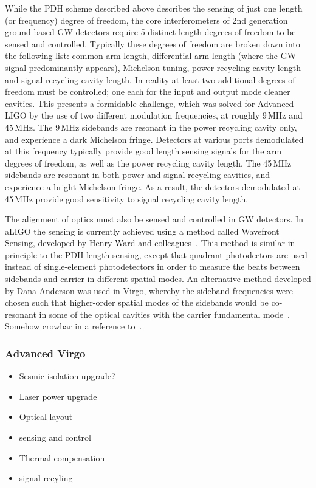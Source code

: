 While the PDH scheme described above describes the sensing of just one length (or frequency) degree of freedom, 
the core interferometers of 2nd generation ground-based GW detectors require 5 distinct length degrees of freedom to 
be sensed and controlled. Typically these degrees of freedom are broken down into the following list: common arm length, 
differential arm length (where the GW signal predominantly appears), Michelson tuning, power recycling cavity length and 
signal recycling cavity length. In reality at least two additional degrees of freedom must be controlled; one each for the input 
and output mode cleaner cavities. This presents a formidable challenge, which was solved for Advanced LIGO by the use of two 
different modulation frequencies, at roughly 9\,MHz and 45\,MHz. The 9\,MHz sidebands are resonant in the power recycling 
cavity only, and experience a dark Michelson fringe. Detectors at various ports demodulated at this frequency typically provide 
good length sensing signals for the arm degrees of freedom, as well as the power recycling cavity length. The 45\,MHz sidebands 
are resonant in both power and signal recycling cavities, and experience a bright Michelson fringe. As a result, the detectors demodulated 
at 45\,MHz provide good sensitivity to signal recycling cavity length.

The alignment of optics must also be sensed and controlled in GW detectors. In aLIGO the sensing is currently achieved using a method 
called Wavefront Sensing, developed by Henry Ward and colleagues~\cite{Morrison1994, Morrison1994b}. 
This method is similar in principle to the PDH length sensing, 
except that quadrant photodectors are used 
instead of single-element photodetectors in order to measure the beats between sidebands and carrier in different spatial modes. An 
alternative method developed by Dana Anderson was used in Virgo, whereby the sideband frequencies were chosen such that higher-order 
spatial modes of the sidebands would be co-resonant in some of the optical cavities with the carrier fundamental mode~\cite{Anderson1984}. 
Somehow crowbar in a reference to~\cite{Fritschel1998}.

\subsubsection{Advanced Virgo}
\begin{itemize}
\item Sesmic isolation upgrade?
\item Laser power upgrade
\item Optical layout
\item sensing and control
\item Thermal compensation
\item signal recyling
\end{itemize}